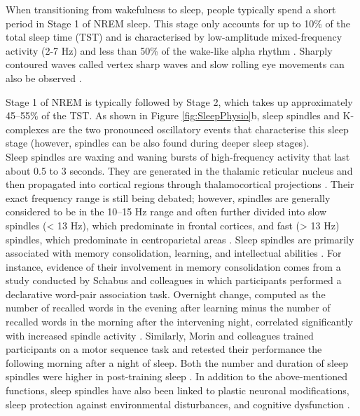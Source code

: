 When transitioning from wakefulness to sleep, people typically spend a short period in Stage 1 of NREM sleep. This stage only accounts for up to 10\% of the total sleep time (TST) and is characterised by low-amplitude mixed-frequency activity (2-7 Hz) and less than 50\% of the wake-like alpha rhythm \parencite[8-13 Hz;][]{moser_sleep_2009, silber_visual_2007}. Sharply contoured waves called vertex sharp waves and slow rolling eye movements can also be observed \parencite{silber_visual_2007}. 

Stage 1 of NREM is typically followed by Stage 2, which takes up approximately 45–55\% of the TST. As shown in Figure \ref{fig:SleepPhysio}b, sleep spindles and K-complexes are the two pronounced oscillatory events that characterise this sleep stage (however, spindles can be also found during deeper sleep stages). \\
Sleep spindles are waxing and waning bursts of high-frequency activity that last about 0.5 to 3 seconds. They are generated in the thalamic reticular nucleus and then propagated into cortical regions through thalamocortical projections \parencite{de_gennaro_sleep_2003}. Their exact frequency range is still being debated; however, spindles are generally considered to be in the 10–15 Hz range and often further divided into slow spindles (< 13 Hz), which predominate in frontal cortices, and fast (> 13 Hz) spindles, which predominate in centroparietal areas \parencite{andrillon_sleep_2011,de_gennaro_sleep_2003,fernandez_sleep_2020,schabus_hemodynamic_2007,ulrich_sleep_2016}. Sleep spindles are primarily associated with memory consolidation, learning, and intellectual abilities \parencite{fernandez_sleep_2020,ulrich_sleep_2016}. For instance, evidence of their involvement in memory consolidation comes from a study conducted by Schabus and colleagues in which participants performed a declarative word-pair association task. Overnight change, computed as the number of recalled words in the evening after learning minus the number of recalled words in the morning after the intervening night, correlated significantly with increased spindle activity \parencite{schabus_sleep_2004}. Similarly, Morin and colleagues trained participants on a motor sequence task and retested their performance the following morning after a night of sleep. Both the number and duration of sleep spindles were higher in post-training sleep \parencite{morin_motor_2008}. In addition to the above-mentioned functions, sleep spindles have also been linked to plastic neuronal modifications, sleep protection against environmental disturbances, and cognitive dysfunction \parencite{astori_manipulating_2013,bergmann_local_2008,rasch_about_2013}.\\
